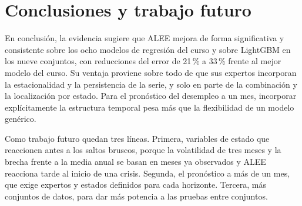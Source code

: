 \documentclass[11pt]{article}
\begin{document}
\section{Conclusiones y trabajo futuro}
\label{sec:conclusiones}

En conclusión, la evidencia sugiere que ALEE mejora de forma significativa y consistente sobre los ocho modelos de regresión del curso y sobre LightGBM en los nueve conjuntos, con reducciones del error de 21\,\% a 33\,\% frente al mejor modelo del curso. Su ventaja proviene sobre todo de que sus expertos incorporan la estacionalidad y la persistencia de la serie, y solo en parte de la combinación y la localización por estado. Para el pronóstico del desempleo a un mes, incorporar explícitamente la estructura temporal pesa más que la flexibilidad de un modelo genérico.

Como trabajo futuro quedan tres líneas. Primera, variables de estado que reaccionen antes a los saltos bruscos, porque la volatilidad de tres meses y la brecha frente a la media anual se basan en meses ya observados y ALEE reacciona tarde al inicio de una crisis. Segunda, el pronóstico a más de un mes, que exige expertos y estados definidos para cada horizonte. Tercera, más conjuntos de datos, para dar más potencia a las pruebas entre conjuntos.

\newpage
\end{document}
